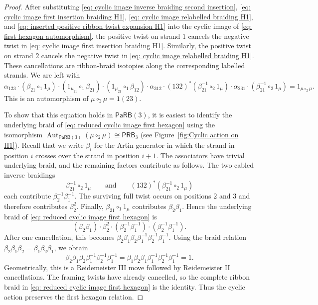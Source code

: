 \documentclass{amsart}
\newcommand{\PaRB}{\mathsf{PaRB}}
\newcommand{\Aut}{\operatorname{Aut}}
\newcommand{\PRB}{\mathsf{PRB}} %
\theoremstyle{definition}
\numberwithin{equation}{section}
\begin{document}
\begin{proof}
After substituting \eqref{eq: cyclic image inverse braiding second insertion},
\eqref{eq: cyclic image first insertion braiding H1},
\eqref{eq: cyclic image relabelled braiding H1}, and
\eqref{eq: inserted positive ribbon twist expansion H1} into the
cyclic image of \eqref{eq: first hexagon automorphism}, the positive twist on strand $1$ cancels the negative twist in \eqref{eq: cyclic image first insertion braiding H1}. Similarly, the positive twist on strand $2$ cancels the negative twist in
\eqref{eq: cyclic image relabelled braiding H1}. These cancellations are ribbon-braid isotopies along the corresponding labelled strands.
We are left with
\begin{equation}
\label{eq: reduced cyclic image first hexagon}
\alpha_{123}
\cdot(\beta_{21}\circ_1 1_\mu)
\cdot(1_{\mu_{21}}\circ_1\beta_{21})
\cdot(1_{\mu_{21}}\circ_1\beta_{12})
\cdot\alpha_{312}
\cdot(132)^*(\beta_{21}^{-1}\circ_2 1_\mu)
\cdot\alpha_{231}
\cdot(\beta_{21}^{-1}\circ_2 1_\mu) = 1_{\mu\circ_2\mu}. \end{equation} This is an automorphism of
$\mu\circ_2\mu=1(23)$.

To show that this equation holds in $\PaRB(3)$, it is easiest to identify the underlying braid of
\eqref{eq: reduced cyclic image first hexagon} using the isomorphism $\Aut_{\PaRB(3)}(\mu\circ_2\mu)\cong \PRB_3$ (see Figure~\ref{fig:Cyclic action on H1}). Recall that we write $\beta_i$ for the Artin generator in which the strand in position $i$ crosses over the strand in position $i+1$. The associators have trivial underlying braid, and the remaining factors contribute as follows. The two cabled inverse
braidings
\[ 
\beta_{21}^{-1}\circ_2 1_\mu
\qquad\text{and}\qquad
(132)^*(\beta_{21}^{-1}\circ_2 1_\mu)
\]
each contribute $\beta_2^{-1}\beta_1^{-1}$. The surviving full twist occurs on positions $2$ and $3$ and therefore contributes $\beta_2^2$. Finally,
$\beta_{21}\circ_1 1_\mu$ contributes $\beta_2\beta_1$. Hence the underlying braid of
\eqref{eq: reduced cyclic image first hexagon} is
\begin{equation}
\label{eq: braid word cyclic first hexagon}
(\beta_2\beta_1)
\cdot\beta_2^2
\cdot(\beta_2^{-1}\beta_1^{-1})
\cdot(\beta_2^{-1}\beta_1^{-1}).
\end{equation}
After one cancellation, this becomes
$\beta_2\beta_1\beta_2
\beta_1^{-1}\beta_2^{-1}\beta_1^{-1}$.
Using the braid relation
$\beta_2\beta_1\beta_2=\beta_1\beta_2\beta_1$, we obtain
\begin{equation}
\label{eq: braid reduction cyclic first hexagon}
\beta_2\beta_1\beta_2\beta_1^{-1}\beta_2^{-1}\beta_1^{-1} =
\beta_1\beta_2\beta_1 \beta_1^{-1}\beta_2^{-1}\beta_1^{-1} = 1.
\end{equation}
Geometrically, this is a Reidemeister III move followed by Reidemeister II cancellations. The framing twists have already
cancelled, so the complete ribbon braid in \eqref{eq: reduced cyclic image first hexagon} is the identity.
Thus the cyclic action preserves the first hexagon relation.


\end{proof}
\end{document}
